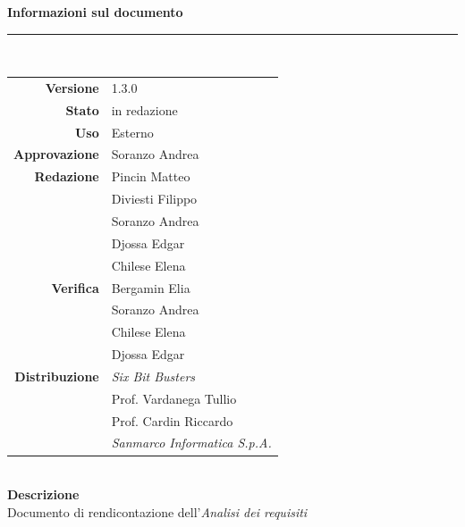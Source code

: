 \begin{titlepage}
\begin{center}
	\large \textbf{Informazioni sul documento} \\
	\rule{0.6\textwidth}{0.4pt}
	\\[0.5cm]
	\begin{tabular}{r|l}
		\textbf{Versione} & 1.3.0\\
		\textbf{Stato} & in redazione\\
		\textbf{Uso} & Esterno\\                         
		\textbf{Approvazione} & Soranzo Andrea\\                      
		\textbf{Redazione} & Pincin Matteo\\ & Diviesti Filippo\\ & Soranzo Andrea \\ & Djossa Edgar \\ & Chilese Elena \\
		\textbf{Verifica} & Bergamin Elia\\ & Soranzo Andrea \\ & Chilese Elena \\  & Djossa Edgar \\                     
		\textbf{Distribuzione} & \textit{Six Bit Busters} \\ & Prof. Vardanega Tullio \\ & Prof. Cardin Riccardo \\ & \textit{Sanmarco Informatica S.p.A.}
	\end{tabular}	
	\\[0.8cm]

	\large \textbf{Descrizione} \\ Documento di rendicontazione dell'\textit{Analisi dei requisiti}
	
	\end{center}
\end{titlepage}
